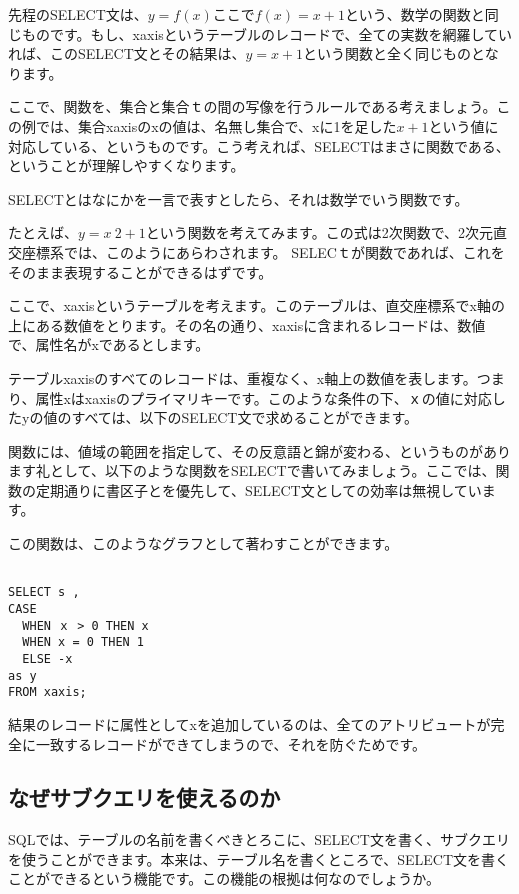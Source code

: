 先程のSELECT文は、$y=f(x)$ここで$f(x)=x+1$という、数学の関数と同じものです。もし、xaxisというテーブルのレコードで、全ての実数を網羅していれば、このSELECT文とその結果は、$y=x+1$という関数と全く同じものとなります。

ここで、関数を、集合と集合ｔの間の写像を行うルールである考えましょう。この例では、集合xaxisのxの値は、名無し集合で、xに1を足した$x+1$という値に対応している、というものです。こう考えれば、SELECTはまさに関数である、ということが理解しやすくなります。

SELECTとはなにかを一言で表すとしたら、それは数学でいう関数です。

たとえば、$y=x~2+1$という関数を考えてみます。この式は2次関数で、2次元直交座標系では、このようにあらわされます。
SELECｔが関数であれば、これをそのまま表現することができるはずです。

ここで、xaxisというテーブルを考えます。このテーブルは、直交座標系でx軸の上にある数値をとります。その名の通り、xaxisに含まれるレコードは、数値で、属性名がxであるとします。

テーブルxaxisのすべてのレコードは、重複なく、x軸上の数値を表します。つまり、属性xはxaxisのプライマリキーです。このような条件の下、ｘの値に対応したyの値のすべては、以下のSELECT文で求めることができます。

関数には、値域の範囲を指定して、その反意語と錦が変わる、というものがあります礼として、以下のような関数をSELECTで書いてみましょう。ここでは、関数の定期通りに書区子とを優先して、SELECT文としての効率は無視しています。

この関数は、このようなグラフとして著わすことができます。


\begin{verbatim}

SELECT s ,
CASE
  WHEN ｘ > 0 THEN x
  WHEN x = 0 THEN 1
  ELSE -x
as y
FROM xaxis;
\end{verbatim}

結果のレコードに属性としてxを追加しているのは、全てのアトリビュートが完全に一致するレコードができてしまうので、それを防ぐためです。

\subsection{なぜサブクエリを使えるのか}

SQLでは、テーブルの名前を書くべきとろこに、SELECT文を書く、サブクエリを使うことができます。本来は、テーブル名を書くところで、SELECT文を書くことができるという機能です。この機能の根拠は何なのでしょうか。

